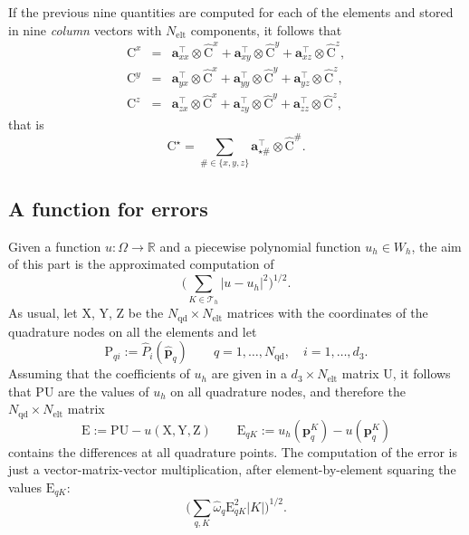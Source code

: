 \documentclass[10pt,english]{article}
\newcommand{\Nelt}{{N_{\mathrm{elt}}}}
\newcommand{\Nnd}{{N_{\mathrm{qd}}}}
\begin{document}
If the previous nine quantities are computed for each of the elements and stored in nine {\em column} vectors with $\Nelt$ components, it follows that
\begin{eqnarray*}
\mathrm C^x &=& \mathbf a_{xx}^\top \otimes \widehat{\mathrm C}^x+\mathbf a_{xy}^\top \otimes \widehat{\mathrm C}^y+\mathbf a_{xz}^\top \otimes \widehat{\mathrm C}^z,\\
\mathrm C^y &=& \mathbf a_{yx}^\top \otimes \widehat{\mathrm C}^x+\mathbf a_{yy}^\top \otimes \widehat{\mathrm C}^y+\mathbf a_{yz}^\top \otimes \widehat{\mathrm C}^z,\\
\mathrm C^z &=& \mathbf a_{zx}^\top \otimes \widehat{\mathrm C}^x+\mathbf a_{zy}^\top \otimes \widehat{\mathrm C}^y+\mathbf a_{zz}^\top \otimes \widehat{\mathrm C}^z,
\end{eqnarray*}
that is
\[
\mathrm C^\star=\sum_{\#\in \{x,y,z\}} \mathbf a_{\star\#}^\top\otimes\widehat{\mathrm C}^\#.
\]




\subsection{A function for errors}\label{sec:3.8}

Given a function $u:\Omega\to \mathbb R$ and a piecewise polynomial function $u_h\in W_h$, the aim of this part is the approximated computation of
\[
\Big( \sum_{K\in \mathcal T_h} |u-u_h|^2\Big)^{1/2}.
\]
As usual, let $\mathrm X$, $\mathrm Y$, $\mathrm Z$ be the $\Nnd\times \Nelt$ matrices with the coordinates of the quadrature nodes on all the elements and let
\[
\mathrm P_{qi}:=\widehat P_i(\widehat{\mathbf p}_q) \qquad q=1,\ldots,\Nnd, \quad i=1,\ldots,d_3.
\]
Assuming that the coefficients of $u_h$ are given in a $d_3\times \Nelt$ matrix $\mathrm U$, it follows that $\mathrm P\mathrm U$ are the values of $u_h$ on all quadrature nodes, and therefore the $\Nnd\times \Nelt$ matrix
\[
\mathrm E:=\mathrm P \mathrm U-u(\mathrm X,\mathrm Y,\mathrm Z)\qquad 
\mathrm E_{qK}:=u_h(\mathbf p_q^K)-u(\mathbf p^K_q)
\]
contains the differences at all quadrature points. The computation of the error is just a vector-matrix-vector multiplication, after element-by-element squaring the values $\mathrm E_{qK}$:
\[
\Big(\sum_{q,K} \widehat\omega_q \mathrm E_{qK}^2 |K|\Big)^{1/2}.
\]




\end{document}

